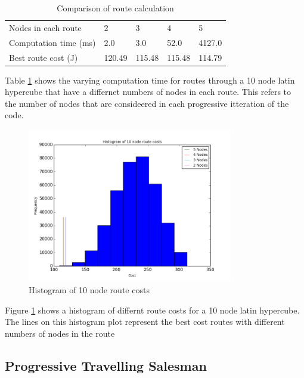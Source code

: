 \documentclass[a4paper,12pt,twoside]{article}
\begin{document}
\begin{table}[width=\textwidth]
\centering
    \begin{tabular}{lllll}
    Nodes in each route	& 2	& 3	& 4	& 5	\\
Computation time (ms)	& 2.0	& 3.0	& 52.0	& 4127.0	\\
Best route cost (J)	& 120.49	& 115.48	& 115.48	& 114.79	\\

    \end{tabular}
\caption{Comparison of route calculation}
\label{tbl:comparison_of_route_calculation}
\end{table}

Table \ref{tbl:comparison_of_route_calculation} shows the varying computation time for routes through a 10 node latin hypercube that have a differnet numbers of nodes in each route. This refers to the number of nodes that are consideered in each progressive itteration of the code.

\begin{figure}[H]
\centering
\includegraphics[width=0.8\textwidth]{figures/histogram_of_10_node_route_costs.png} 
\caption{Histogram of 10 node route costs}
\label{fig:histogram_of_10_node_route_costs}
\end{figure}

Figure \ref{fig:histogram_of_10_node_route_costs} shows a histogram of differnt route costs for a 10 node latin hypercube. The lines on this histogram plot represent the best cost routes with different numbers of nodes in the route

\subsection{Progressive Travelling Salesman}
\label{sec:progressive_travelling_salesman}
\end{document}
